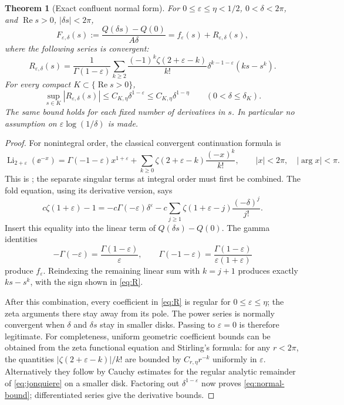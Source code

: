 \documentclass[11pt,a4paper]{article}
\numberwithin{equation}{section}
\newtheorem{theorem}{Theorem}[section]
\theoremstyle{definition}
\theoremstyle{remark}
\DeclareMathOperator{\Li}{Li}
\DeclareMathOperator{\Rea}{Re}
\newcommand{\ep}{\varepsilon}\newcommand{\la}{\lambda}
\begin{document}
\begin{theorem}[Exact confluent normal form]\label{thm:normal}
For \(0\le\ep\le\eta<1/2\), \(0<\delta<2\pi\), and
\(\Rea s>0\), \(|\delta s|<2\pi\),
\begin{equation}\label{eq:normal}
 F_{\ep,\delta}(s):=\frac{Q(\delta s)-Q(0)}{A\delta}
       =f_\ep(s)+R_{\ep,\delta}(s),
\end{equation}
where the following series is convergent:
\begin{equation}\label{eq:R}
 R_{\ep,\delta}(s)=
 \frac1{\Gamma(1-\ep)}
 \sum_{k\ge2}\frac{(-1)^k\zeta(2+\ep-k)}{k!}
   \delta^{k-1-\ep}(ks-s^k).
\end{equation}
For every compact \(K\subset\{\Rea s>0\}\),
\begin{equation}\label{eq:normal-bound}
 \sup_{s\in K}|R_{\ep,\delta}(s)|
 \le C_{K,\eta}\delta^{1-\ep}
 \le C_{K,\eta}\delta^{1-\eta}\qquad(0<\delta\le\delta_K).
\end{equation}
The same bound holds for each fixed number of derivatives in \(s\).
In particular no assumption on \(\ep\log(1/\delta)\) is made.
\end{theorem}
\begin{proof}
For nonintegral order, the classical convergent continuation formula is
\begin{equation}\label{eq:jonquiere}
 \Li_{2+\ep}(\ee^{-x})
 =\Gamma(-1-\ep)x^{1+\ep}
  +\sum_{k\ge0}\zeta(2+\ep-k)\frac{(-x)^k}{k!},
 \qquad |x|<2\pi,\quad |\arg x|<\pi.
\end{equation}
This is \cite[Eq.~25.12.12]{dlmf-polylog}; the separate singular terms
at integral order must first be combined. The fold equation, using its
derivative version, says
\[
 c\zeta(1+\ep)-1
 =-c\Gamma(-\ep)\delta^\ep
  -c\sum_{j\ge1}\zeta(1+\ep-j)\frac{(-\delta)^j}{j!}.
\]
Insert this equality into the linear term of
\(Q(\delta s)-Q(0)\). The gamma identities
\[
 -\Gamma(-\ep)=\frac{\Gamma(1-\ep)}\ep,
 \qquad
 \Gamma(-1-\ep)=\frac{\Gamma(1-\ep)}{\ep(1+\ep)}
\]
produce \(f_\ep\). Reindexing the remaining linear sum with \(k=j+1\)
produces exactly \(ks-s^k\), with the sign shown in \eqref{eq:R}.

After this combination, every coefficient in \eqref{eq:R} is regular
for \(0\le\ep\le\eta\); the zeta arguments there stay away from its
pole. The power series is normally convergent when \(\delta\) and
\(\delta s\) stay in smaller disks. Passing to \(\ep=0\) is therefore
legitimate. For completeness, uniform geometric coefficient bounds can
be obtained from the zeta functional equation and Stirling's formula:
for any \(r<2\pi\), the quantities
\(|\zeta(2+\ep-k)|/k!\) are bounded by \(C_{r,\eta}r^{-k}\)
uniformly in \(\ep\). Alternatively they follow by Cauchy estimates
for the regular analytic remainder of \eqref{eq:jonquiere} on a smaller
disk. Factoring out \(\delta^{1-\ep}\) now proves
\eqref{eq:normal-bound}; differentiated series give the derivative bounds.
\end{proof}
\end{document}
